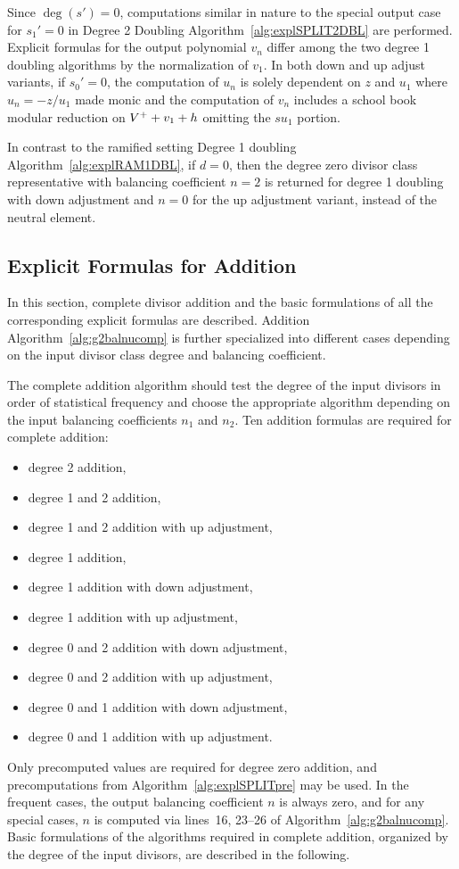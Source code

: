 Since $\deg(s') = 0$, computations similar in nature to the special output case
for $s_1' = 0$ in Degree 2 Doubling Algorithm~\ref{alg:explSPLIT2DBL} are
performed. Explicit formulas for the output polynomial $v_n$ differ among the
two degree 1 doubling algorithms by the normalization of $v_1$. In both down and
up adjust variants, if $s_0' = 0$, the computation of $u_n$ is solely dependent
on $z$ and $u_1$ where $u_n = -z/u_1$ made monic and the computation of $v_n$
includes a school book modular reduction on $V^{+} + v_1 + h$ omitting the $su_1$
portion. 

In contrast to the ramified setting Degree 1 doubling
Algorithm~\ref{alg:explRAM1DBL}, if $d = 0$, then the degree zero divisor class
representative with balancing coefficient $n=2$ is returned for degree 1 doubling
with down adjustment and $n=0$ for the up adjustment variant, instead of the
neutral element.



\subsection{Explicit Formulas for Addition}\label{sec:g2SPLITADD}
In this section, complete divisor addition and the basic formulations of all the
corresponding explicit formulas are described. Addition
Algorithm~\ref{alg:g2balnucomp} is further specialized into different cases
depending on the input divisor class degree and balancing coefficient.

The complete addition algorithm should test the degree of the input divisors in
order of statistical frequency and choose the appropriate algorithm depending on
the input balancing coefficients $n_1$ and $n_2$. Ten addition formulas are
required for complete addition:
\begin{itemize}
    \item[-] degree 2 addition,
    \item[-] degree 1 and 2 addition,
    \item[-] degree 1 and 2 addition with up adjustment,
    \item[-] degree 1 addition,
    \item[-] degree 1 addition with down adjustment,
    \item[-] degree 1 addition with up adjustment,
    \item[-] degree 0 and 2 addition with down adjustment,
    \item[-] degree 0 and 2 addition with up adjustment,
    \item[-] degree 0 and 1 addition with down adjustment,
    \item[-] degree 0 and 1 addition with up adjustment. 
\end{itemize}
Only precomputed values are required for degree zero addition, and
precomputations from Algorithm~\ref{alg:explSPLITpre} may be used. In the
frequent cases, the output balancing coefficient $n$ is always zero, and for any
special cases, $n$ is computed via lines~16, 23--26 of
Algorithm~\ref{alg:g2balnucomp}. Basic formulations of the algorithms required
in complete addition, organized by the degree of the input divisors, are
described in the following.

